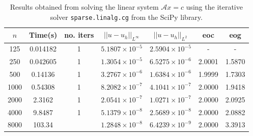 \documentclass{article}
\numberwithin{equation}{section}
\begin{document}
\begin{table}[H]
\centering
\begin{tabular}{|c|c|c|c|c|c|c|}
\hline
$n$ & Time(s) & no. iters & $|| u - u_h ||_{L^{\infty}}$ &$|| u - u_h ||_{L^{2}}$ & eoc & eog \\
\hline
125 & 0.014182 & 1 & $5.1807 \times 10^{-5}$ & $2.5904 \times 10^{-5}$ & - & - \\
250 & 0.042605 & 1 & $1.3054 \times 10^{-5}$ & $6.5275 \times 10^{-6}$ & 2.0001 & 1.5870 \\
500 & 0.14136 & 1 & $3.2767 \times 10^{-6}$ & $1.6384 \times 10^{-6}$ & 1.9999 & 1.7303 \\
1000 & 0.54308 & 1 & $8.2082 \times 10^{-7}$ & $4.1041 \times 10^{-7}$ & 2.0000 & 1.9418 \\
2000 & 2.3162 & 1 & $2.0541 \times 10^{-7}$ & $1.0271 \times 10^{-7}$ & 2.0000 & 2.0925 \\
4000 & 9.8487 & 1 & $5.1379 \times 10^{-8}$ & $2.5689 \times 10^{-8}$ & 2.0000 & 2.0882 \\
8000 & 103.34 & & $1.2848 \times 10^{-8}$ & $6.4239 \times 10^{-9}$ & 2.0000 & 3.3913 \\
\hline
\end{tabular}
\captionsetup{justification=centering}
\caption{Results obtained from solving the linear system $\mathcal{A} x = c$ using the iterative solver  \texttt{sparse.linalg.cg} from the SciPy library.}
\end{table}
\end{document}
